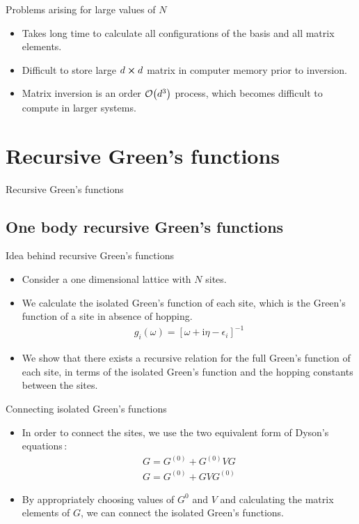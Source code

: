\documentclass[usenames,dvipsnames]{beamer}
\newcommand{\I}{\mathrm{i}}
\begin{document}
\begin{frame}{Problems arising for large values of $ N $}
	\begin{itemize}
		\item Takes long time to calculate all configurations of the basis and all matrix elements.
		\item Difficult to store large $ d \cross d $ matrix in computer memory prior to inversion.
		\item Matrix inversion is an order $ \order{d^3} $ process, which becomes difficult to compute in larger systems.
	\end{itemize}
\end{frame}

\section{Recursive Green's functions}
\begin{frame}
	\centering
	{\Huge Recursive Green's functions}
\end{frame}
\subsection{One body recursive Green's functions}
	\begin{frame}{Idea behind recursive Green's functions}
		\begin{itemize}
			\item{
			Consider a one dimensional lattice with $ N $ sites.
			}
			\item {
				We calculate the isolated Green's function of each site, which is the Green's function of a site in absence of hopping.
				\begin{align}
				g_{i} \left( \omega \right) = \left[ \omega + \I \eta - \epsilon_i \right]^{-1}
				\end{align}
				}
			\item{
				We show that there exists a recursive relation for the full Green's function of each site, in terms of the isolated Green's function and the hopping constants between the sites.
				}
		\end{itemize}
	\end{frame}

\begin{frame}{Connecting isolated Green's functions}
	\begin{itemize}
		\item {In order to connect the sites, we use the two equivalent form of Dyson's equations\,\cite{2013arXiv1304.3934L}:
			\begin{align}
			G = G^{(0)} + G^{(0)}VG\label{eqn:dysonleft}\\
			G = G^{(0)} + GVG^{(0)}\label{eqn:dysonright}
			\end{align}}
		\item {
			By appropriately choosing values of $ G^{0} $ and $ V $ and calculating the matrix elements of $ G $, we can connect the isolated Green's functions.
			}
	\end{itemize}
\end{frame}
\end{document}
